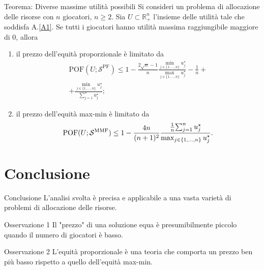 \documentclass{beamer}
\begin{document}
\begin{frame}
	\begin{exampleblock}{Teorema: Diverse massime utilità possibili}
		\vspace{-0.1cm}
		Si consideri un problema di allocazione delle risorse con $n$ giocatori, $n \ge 2$. Sia $U \subset \mathbb{R}^n_+$ l'insieme delle utilità tale che soddisfa A.\ref{A1}. Se tutti i giocatori hanno utilità massima raggiungibile maggiore di $0$, allora
		\vspace{-0.1cm}
		\begin{enumerate}
			\item il prezzo dell'equità proporzionale è limitato da
			\vspace{-0.3cm}
			\begin{multline}
				\text{POF}(U;\mathcal{S}^{\text{PF}}) \le 1 - \frac{2 \sqrt{n} - 1}{n} \frac{\min_{j \in \{1,\dots,n\}} u_j^{\star} }{\max_{j \in \{1,\dots,n\}} u_j^{\star}} - \frac{1}{n} + \\ + \frac{\min_{j \in \{1,\dots,n\}} u_j^{\star}}{\sum_{j=1}^n u_j^{\star}};
			\end{multline}
			\item il prezzo dell'equità max-min è limitato da
			\vspace{-0.3cm}
			\begin{equation}
				\text{POF}(U;\mathcal{S}^{\text{MMF}}) \le 1 - \frac{4n}{(n+1)^2} \frac{\frac{1}{n}{\sum_{j=1}^n u_j^{\star}}}{\max_{j \in \{1,\dots,n\}} u_j^{\star}}.
				\vspace{-0.3cm}
			\end{equation}
		\end{enumerate}
	\vspace{-0.1cm}
	\end{exampleblock}
\end{frame}

\section{Conclusione}

\begin{frame}{Conclusione}
	L'analisi svolta è precisa e applicabile a una vasta varietà di problemi di allocazione delle risorse.
	\begin{exampleblock}{Osservazione 1}
		Il "prezzo" di una soluzione equa è presumibilmente piccolo quando il numero di giocatori è basso.
	\end{exampleblock}
	\begin{exampleblock}{Osservazione 2}
		L'equità proporzionale è una teoria che comporta un prezzo ben più basso rispetto a quello dell'equità max-min. 
	\end{exampleblock}
\end{frame}

\begin{frame}
	
\end{frame}
\end{document}
